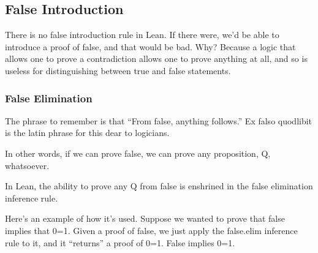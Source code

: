 \documentclass[letterpaper,10pt,english]{sphinxmanual}
\begin{document}
\begin{sphinxVerbatim}[commandchars=\\\{\}]
        
        
       
\end{sphinxVerbatim}


\subsection{False Introduction}
\label{\detokenize{15-proofs:false-introduction}}
There is no false introduction rule in Lean.  If there were, we’d be
able to introduce a proof of false, and that would be bad. Why?
Because a logic that allows one to prove a contradiction allows one to
prove anything at all, and so is useless for distinguishing between
true and false statements.


\subsubsection{False Elimination}
\label{\detokenize{15-proofs:false-elimination}}
The phrase to remember is that “From false, anything follows.” Ex
falso quodlibit is the latin phrase for this dear to logicians.

In other words, if we can prove false, we can prove any proposition,
Q, whatsoever.

In Lean, the ability to prove any Q from false is enshrined in the
false elimination inference rule.

Here’s an example of how it’s used. Suppose we wanted to prove that
false implies that 0=1. Given a proof of false, we just apply the
false.elim inference rule to it, and it “returns” a proof of
0=1. False implies 0=1.

\begin{sphinxVerbatim}[commandchars=\\\{\}]
       
        
\end{sphinxVerbatim}
\end{document}
